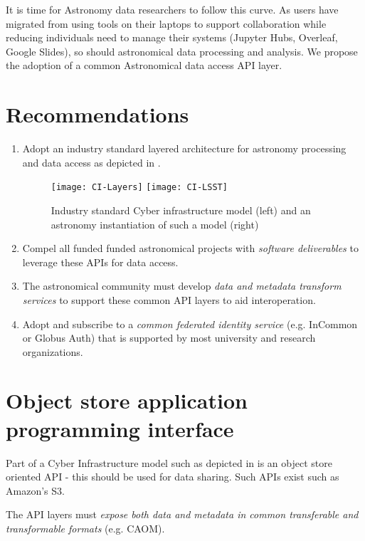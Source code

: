 It is time for Astronomy data researchers to follow this curve. As users have migrated
from using tools on their laptops to support collaboration while reducing
individuals need to manage their systems (Jupyter Hubs, Overleaf, Google Slides),
so should astronomical data processing and analysis. We propose the adoption of
a common Astronomical data access \gls{API} layer.


\section{Recommendations }
\begin{enumerate}
\item Adopt an industry  standard layered architecture for astronomy processing and data access as
depicted in .


\begin{figure}
\centering
\texttt{[image: CI-Layers]}
\texttt{[image: CI-LSST]}
\caption{Industry standard Cyber infrastructure model (left) and an astronomy instantiation of such a model (right)\label{fig:ci}}
\end{figure}

\item Compel all funded funded astronomical projects with \emph{software deliverables} to  leverage these APIs for data access.

\item The astronomical community must develop \emph{data and \gls{metadata} transform services}
to support these common \gls{API} layers to aid interoperation.

\item Adopt and subscribe to a \emph{common federated identity service} (e.g. InCommon or
Globus Auth) that is supported by most university and research organizations.
\end{enumerate}




\section{Object store application programming interface}
Part of a Cyber Infrastructure model such as depicted in  is an object store oriented API - this should be used for data sharing. Such APIs exist such as Amazon's S3.

The  \gls{API} layers must \emph{expose both data and \gls{metadata} in common
transferable and transformable formats} (e.g. \gls{CAOM}).

